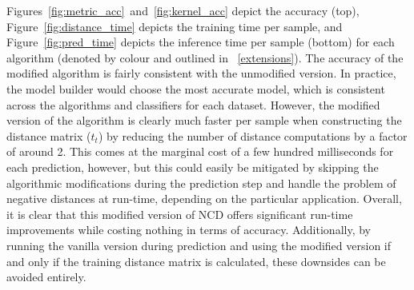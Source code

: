 \documentclass[preprint,12pt]{elsarticle}
\begin{document}
Figures~\ref{fig:metric_acc}~and~\ref{fig:kernel_acc} depict the accuracy (top), Figure~\ref{fig:distance_time} depicts the   training time per sample, and Figure~\ref{fig:pred_time}  depicts the inference time per sample (bottom) for each algorithm (denoted by colour and outlined in ~\ref{extensions}).
The accuracy of the modified algorithm is fairly consistent with the unmodified version.
In practice, the model builder would choose the most accurate model, which is consistent across the algorithms and classifiers for each dataset.
However, the modified version of the algorithm is clearly much faster per sample when constructing the distance matrix ($t_t$) by reducing the number of distance computations by a factor of around 2.
This comes at the marginal cost of a few hundred milliseconds for each prediction, however, but this could easily be mitigated by skipping the algorithmic modifications during the prediction step and handle the problem of negative distances at run-time, depending on the particular application.
Overall, it is clear that this modified version of NCD offers significant run-time improvements while costing nothing in terms of accuracy.
Additionally, by running the vanilla version during prediction and using the modified version if and only if the training distance matrix is calculated, these downsides can be avoided entirely.
\end{document}
